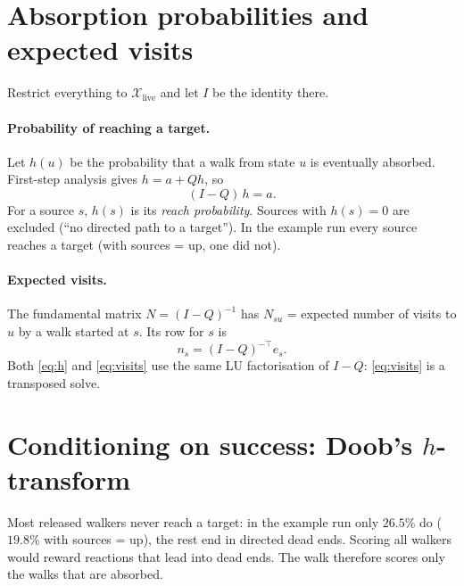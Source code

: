 \documentclass[11pt]{article}
\newcommand{\X}{\mathcal{X}}
\begin{document}
\section{Absorption probabilities and expected visits}

Restrict everything to $\X_{\mathrm{live}}$ and let $I$ be the identity there.

\paragraph{Probability of reaching a target.} Let $h(u)$ be the probability that a
walk from state $u$ is eventually absorbed. First-step analysis gives
$h = a + Qh$, so
\begin{equation}
  (I-Q)\,h = a .
  \label{eq:h}
\end{equation}
For a source $s$, $h(s)$ is its \emph{reach probability}. Sources with $h(s)=0$ are
excluded (``no directed path to a target''). In the example run every source reaches
a target (with sources = up, one did not).

\paragraph{Expected visits.} The fundamental matrix $N=(I-Q)^{-1}$ has $N_{su}$ =
expected number of visits to $u$ by a walk started at $s$. Its row for $s$ is
\begin{equation}
  n_s = (I-Q)^{-\top} e_s .
  \label{eq:visits}
\end{equation}
Both \eqref{eq:h} and \eqref{eq:visits} use the same LU factorisation of $I-Q$:
\eqref{eq:visits} is a transposed solve.

\section{Conditioning on success: Doob's \texorpdfstring{$h$}{h}-transform}

Most released walkers never reach a target: in the example run only $26.5\%$ do
($19.8\%$ with sources = up), the rest end in directed dead ends. Scoring all
walkers would reward reactions that lead into dead ends. The walk therefore scores
only the walks that are absorbed.
\end{document}
